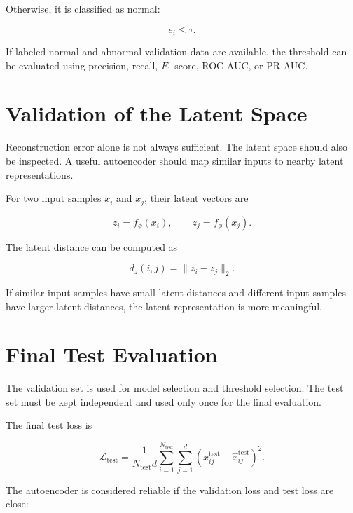 \documentclass[a4paper]{article}
\begin{document}
        Otherwise, it is classified as normal:
        
        \[
            e_i \leq \tau.
        \]
        
        If labeled normal and abnormal validation data are available, the threshold can be evaluated using precision, recall, \(F_1\)-score, ROC-AUC, or PR-AUC.
    
    
    \section{Validation of the Latent Space}
        
        Reconstruction error alone is not always sufficient.
        The latent space should also be inspected.
        A useful autoencoder should map similar inputs to nearby latent representations.
        
        For two input samples \(x_i\) and \(x_j\), their latent vectors are
        
        \[
            z_i=f_{\phi}(x_i),
            \qquad
            z_j=f_{\phi}(x_j).
        \]
        
        The latent distance can be computed as
        
        \[
            d_z(i,j)
            =
            \|z_i-z_j\|_2.
        \]
        
        If similar input samples have small latent distances and different input samples have larger latent distances, the latent representation is more meaningful.
    
    
    \section{Final Test Evaluation}
        
        The validation set is used for model selection and threshold selection.
        The test set must be kept independent and used only once for the final evaluation.
        
        The final test loss is
        
        \[
            \mathcal{L}_{\mathrm{test}}
            =
            \frac{1}{N_{\mathrm{test}}d}
            \sum_{i=1}^{N_{\mathrm{test}}}
            \sum_{j=1}^{d}
            (x_{ij}^{\mathrm{test}}-\hat{x}_{ij}^{\mathrm{test}})^2.
        \]
        
        The autoencoder is considered reliable if the validation loss and test loss are close:
        
\end{document}
